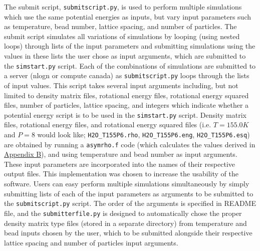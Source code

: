 \documentclass[11pt]{article}
\begin{document}
The submit script, \texttt{submitscript.py}, is used to perform multiple simulations which use the same potential energies as inputs, but vary input parameters such as temperature, bead number, lattice spacing, and number of particles. The submit script simulates all variations of simulations by looping (using nested loops) through lists of the input parameters and submitting simulations using the values in these lists the user chose as input arguments, which are submitted to the \texttt{simstart.py} script. Each of the combinations of simulations are submitted to a server (nlogn or compute canada) as \texttt{submitscript.py} loops through the lists of input values. This script takes several input arguments including, but not limited to density matrix files, rotational energy files, rotational energy squared files, number of particles, lattice spacing, and integers which indicate whether a potential energy script is to be used in the \texttt{simstart.py} script. Density matrix files, rotational energy files, and rotational energy squared files (i.e. \begin{math} T = 155.0 K \end{math} and \begin{math} P = 8 \end{math} would look like; \texttt{H2O\_T155P6.rho}, \texttt{H2O\_T155P6.eng}, \texttt{H2O\_T155P6.esq}) are obtained by running a \texttt{asymrho.f} code (which calculates the values derived in \hyperlink{wr-appendix-b}{Appendix B}), and using temperature and bead number as input arguments. These input parameters are incorporated into the names of their respective output files. This implementation was chosen to increase the usability of the software. Users can easy perform multiple simulations simultaneously by simply submitting lists of each of the input parameters as arguments to be submitted to the \texttt{submitscript.py} script. The order of the arguments is specified in README file, and the \texttt{submitterfile.py} is designed to automatically chose the proper density matrix type files (stored in a separate directory) from temperature and bead inputs chosen by the user, which to be submitted alongside their respective lattice spacing and number of particles input arguments.
\end{document}
